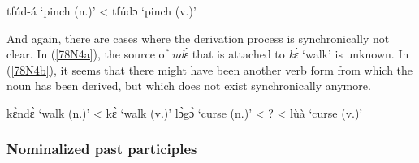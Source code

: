 \begin{exe}
\ex\label{78N3} tfúd-á `pinch (n.)' < tfúdɔ `pinch (v.)'
\end{exe}

\noindent And again, there are cases where the derivation process is synchronically not clear. In (\ref{78N4a}), the source of {\itshape ndɛ̀} that is attached to {\itshape kɛ̀} `walk' is unknown. In (\ref{78N4b}), it seems that there might have been another verb form from which the noun has been derived, but which does not exist synchronically anymore.

\begin{exe}
\ex\label{78N4} 
\begin{xlist}
\ex\label{78N4a} kɛ̀ndɛ̀ `walk (n.)' <  kɛ̀ `walk (v.)'
\ex\label{78N4b} lɔ̀gɔ̀ `curse (n.)' < ? <  lùà `curse (v.)' 
\end{xlist}
\end{exe}














\subsubsection{Nominalized past participles}
\label{sec:NOMPart}

